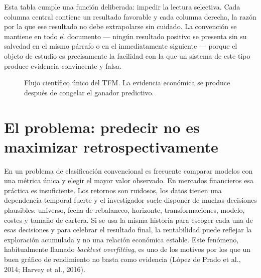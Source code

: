 Esta tabla cumple una función deliberada: impedir la lectura selectiva. Cada columna central
contiene un resultado favorable y cada columna derecha, la razón por la que ese resultado no debe
extrapolarse sin cuidado. La convención se mantiene en todo el documento --- ningún resultado
positivo se presenta sin su salvedad en el mismo párrafo o en el inmediatamente siguiente --- porque
el objeto de estudio es precisamente la facilidad con la que un sistema de este tipo produce
evidencia convincente y falsa.

\begin{figure}[H]
\centering
{}
\caption{Flujo científico único del TFM. La evidencia económica se produce después de congelar el
ganador predictivo.}
\end{figure}

\section{El problema: predecir no es maximizar retrospectivamente}

En un problema de clasificación convencional es frecuente comparar modelos con una métrica única y
elegir el mayor valor observado. En mercados financieros esa práctica es insuficiente. Los retornos
son ruidosos, los datos tienen una dependencia temporal fuerte y el investigador suele disponer de
muchas decisiones plausibles: universo, fecha de rebalanceo, horizonte, transformaciones, modelo,
costes y tamaño de cartera. Si se usa la misma historia para escoger cada una de esas decisiones y
para celebrar el resultado final, la rentabilidad puede reflejar la exploración acumulada y no una
relación económica estable. Este fenómeno, habitualmente llamado \textit{backtest overfitting}, es
uno de los motivos por los que un buen gráfico de rendimiento no basta como evidencia
(López de Prado et al., 2014; Harvey et al., 2016).

